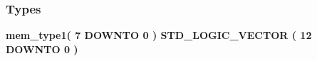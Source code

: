 \subsubsection*{Types}
 \begin{DoxyCompactItemize}
\item 
{\bfseries {\bf mem\+\_\+type1}{\bfseries \textcolor{vhdlchar}{(}\textcolor{vhdlchar}{ }\textcolor{vhdlchar}{ } \textcolor{vhdldigit}{7} \textcolor{vhdlchar}{ }\textcolor{keywordflow}{D\+O\+W\+N\+TO}\textcolor{vhdlchar}{ }\textcolor{vhdlchar}{ } \textcolor{vhdldigit}{0} \textcolor{vhdlchar}{ }\textcolor{vhdlchar}{)}\textcolor{vhdlchar}{ }\textcolor{vhdlchar}{ }\textcolor{comment}{S\+T\+D\+\_\+\+L\+O\+G\+I\+C\+\_\+\+V\+E\+C\+T\+OR}\textcolor{vhdlchar}{ }\textcolor{vhdlchar}{(}\textcolor{vhdlchar}{ }\textcolor{vhdlchar}{ } \textcolor{vhdldigit}{12} \textcolor{vhdlchar}{ }\textcolor{keywordflow}{D\+O\+W\+N\+TO}\textcolor{vhdlchar}{ }\textcolor{vhdlchar}{ } \textcolor{vhdldigit}{0} \textcolor{vhdlchar}{ }\textcolor{vhdlchar}{)}\textcolor{vhdlchar}{ }}} 
\end{DoxyCompactItemize}
